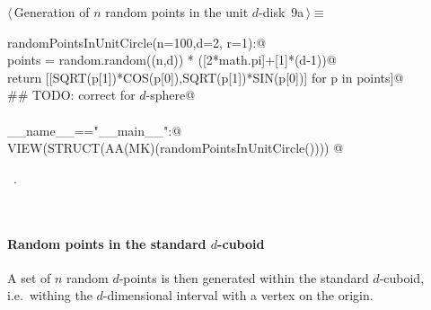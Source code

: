 \documentclass[11pt,oneside]{article}	%
\begin{document}
\begin{flushleft} \small
\begin{minipage}{\linewidth} \label{scrap16}
\protect{}$\langle\,$Generation of $n$ random points in the unit $d$-disk\nobreak\ {\footnotesize 9a}$\,\rangle\equiv$
\vspace{-1ex}
\begin{list}{}{} \item
\mbox{}\verb@def randomPointsInUnitCircle(n=100,d=2, r=1):@\\
\mbox{}\verb@   points = random.random((n,d)) * ([2*math.pi]+[1]*(d-1))@\\
\mbox{}\verb@   return [[SQRT(p[1])*COS(p[0]),SQRT(p[1])*SIN(p[0])] for p in points]@\\
\mbox{}\verb@   ## TODO: correct for $d$-sphere@\\
\mbox{}\verb@@\\
\mbox{}\verb@if __name__=="__main__":@\\
\mbox{}\verb@   VIEW(STRUCT(AA(MK)(randomPointsInUnitCircle()))) @\\
\mbox{}\verb@@{\NWsep}
\end{list}
\vspace{-1ex}
\footnotesize\addtolength{\baselineskip}{-1ex}
\begin{list}{}{\setlength{\itemsep}{-\parsep}\setlength{\itemindent}{-\leftmargin}}
\item \NWtxtMacroRefIn\ .
\end{list}
\end{minipage}\\[4ex]
\end{flushleft}

\paragraph{Random points in the standard $d$-cuboid} 
A set of $n$ random $d$-points is then generated within the standard $d$-cuboid, i.e.~withing the $d$-dimensional interval with a vertex on the origin.
\end{document}
